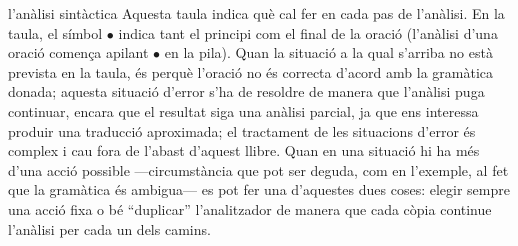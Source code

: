 \begin{persabermes}{l'anàlisi sintàctica}
Aquesta taula indica què cal fer en cada pas de l'anàlisi. En la
taula, el símbol $\bullet$ indica tant el principi com el final de la
oració (l'anàlisi d'una oració comença apilant $\bullet$ en la
pila). Quan la situació a la qual s'arriba no està prevista en la
taula, és perquè l'oració no és correcta d'acord amb la gramàtica
donada; aquesta situació d'error s'ha de resoldre de manera que
l'anàlisi puga continuar, encara que el resultat siga una anàlisi
parcial, ja que ens interessa produir una traducció aproximada; el
tractament de les situacions d'error és complex i cau fora de l'abast
d'aquest llibre. Quan en una situació hi ha més d'una acció possible
---circumstància que pot ser deguda, com en l'exemple, al fet que la
gramàtica és ambigua--- es pot fer una d'aquestes dues coses: elegir
sempre una acció fixa o bé ``duplicar'' l'analitzador de manera que
cada còpia continue l'anàlisi per cada un dels camins.



\end{persabermes}
